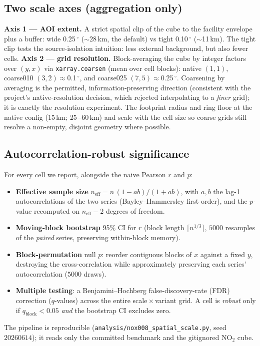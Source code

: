 \documentclass[11pt,a4paper]{article}
\providecommand{\degree}{\ensuremath{^{\circ}}}
\newcommand{\SI}[2]{#1\,#2}
\providecommand{\ce}[1]{\ensuremath{\mathrm{#1}}}
\begin{document}
\subsection{Two scale axes (aggregation only)}
\label{sec:axes}
\textbf{Axis 1 --- AOI extent.} A strict spatial clip of the cube to the facility envelope plus
a buffer: \textsf{wide} \SI{0.25}{\degree} ($\sim$\SI{28}{km}, the default) vs \textsf{tight}
\SI{0.10}{\degree} ($\sim$\SI{11}{km}). The tight clip tests the source-isolation intuition:
less external background, but also fewer cells.
\textbf{Axis 2 --- grid resolution.} Block-averaging the cube by integer factors over $(y,x)$
via \texttt{xarray.coarsen} (mean over cell blocks): \textsf{native} $(1,1)$,
\textsf{coarse010} $(3,2)\!\approx\!$\SI{0.1}{\degree}, and \textsf{coarse025}
$(7,5)\!\approx\!$\SI{0.25}{\degree}. Coarsening by averaging is the permitted,
information-preserving direction (consistent with the project's native-resolution decision,
which rejected interpolating to a \emph{finer} grid); it is exactly the
\citet{parubets_naito_2025} resolution experiment. The footprint radius and ring floor at the
native config (\SI{15}{km}; \SI{25}{}--\SI{60}{km}) and scale with the cell size so coarse
grids still resolve a non-empty, disjoint geometry where possible.

\subsection{Autocorrelation-robust significance}
\label{sec:significance}
For every cell we report, alongside the naive Pearson $r$ and $p$:
\begin{itemize}[leftmargin=1.4em,itemsep=0.15em]
  \item \textbf{Effective sample size} $n_{\text{eff}}=n\,(1-ab)/(1+ab)$, with $a,b$ the lag-1
  autocorrelations of the two series (Bayley--Hammersley first order), and the $p$-value
  recomputed on $n_{\text{eff}}-2$ degrees of freedom.
  \item \textbf{Moving-block bootstrap} 95\% CI for $r$ (block length $\lceil n^{1/3}\rceil$,
  $5000$ resamples of the \emph{paired} series, preserving within-block memory).
  \item \textbf{Block-permutation} null $p$: reorder contiguous blocks of $x$ against a fixed
  $y$, destroying the cross-correlation while approximately preserving each series'
  autocorrelation ($5000$ draws).
  \item \textbf{Multiple testing}: a Benjamini--Hochberg false-discovery-rate (FDR) correction
  ($q$-values) across the entire scale\,$\times$\,variant grid. A cell is \emph{robust} only if
  $q_{\text{block}}<0.05$ \emph{and} the bootstrap CI excludes zero.
\end{itemize}
The pipeline is reproducible (\texttt{analysis/nox008\_spatial\_scale.py}, seed $20260614$); it
reads only the committed benchmark and the gitignored \ce{NO_2} cube.
\end{document}

